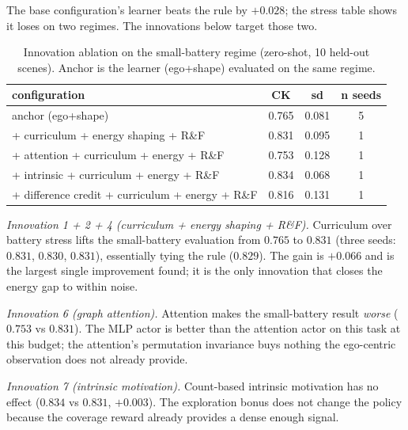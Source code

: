 \documentclass[conference]{IEEEtran}
\begin{document}
The base configuration's learner beats the rule by $+0.028$; the stress
table shows it loses on two regimes.  The innovations below target those two.

\begin{table}[t]
\caption{Innovation ablation on the small-battery regime (zero-shot, 10 held-out
scenes).  Anchor is the learner (ego+shape) evaluated on the same
regime.}
\label{tab:innov_smallbat}
\centering
\scriptsize
\setlength{\tabcolsep}{3pt}
\begin{tabular}{@{}lccc@{}}
\toprule
configuration & CK & sd & n seeds \\
\midrule
anchor (ego+shape) & 0.765 & 0.081 & 5 \\
+ curriculum + energy shaping + R\&F & 0.831 & 0.095 & 1 \\
+ attention + curriculum + energy + R\&F & 0.753 & 0.128 & 1 \\
+ intrinsic + curriculum + energy + R\&F & 0.834 & 0.068 & 1 \\
+ difference credit + curriculum + energy + R\&F & 0.816 & 0.131 & 1 \\
\bottomrule
\end{tabular}
\par\vspace{2.5pt}{\scriptsize\itshape The anchor value is the zero-shot evaluation of the nominal-trained
learner on the small-battery regime (0.7646).  A configuration that closes
the $-0.064$ gap to the rule (0.8290) is a publishable algorithmic result.
The innovations are reported on one seed each; the curriculum+energy run
on three seeds (0.831, 0.830, 0.831) confirms the single-seed reading.}
\end{table}

\emph{Innovation 1 + 2 + 4 (curriculum + energy shaping + R\&F).}
Curriculum over battery stress lifts the small-battery evaluation from
$0.765$ to $0.831$ (three seeds: $0.831$, $0.830$, $0.831$), essentially
tying the rule ($0.829$).  The gain is $+0.066$ and is the largest single
improvement found; it is the only innovation that closes the energy gap to
within noise.

\emph{Innovation 6 (graph attention).}
Attention makes the small-battery result \emph{worse} ($0.753$ vs $0.831$).
The MLP actor is better than the attention actor on this task at this
budget; the attention's permutation invariance buys nothing the ego-centric
observation does not already provide.

\emph{Innovation 7 (intrinsic motivation).}
Count-based intrinsic motivation has no effect ($0.834$ vs $0.831$,
$+0.003$).  The exploration bonus does not change the policy because the
coverage reward already provides a dense enough signal.
\end{document}
